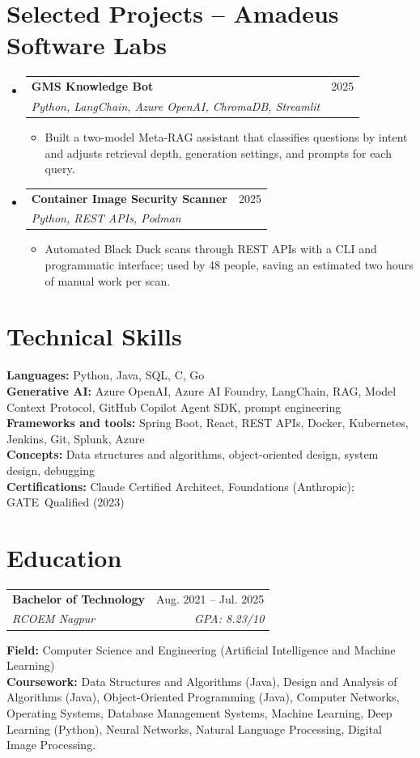 \documentclass[a4paper,11pt]{article}
\makeatletter
\newcommand{\entry}[4]{\item\begin{tabularx}{\textwidth}{@{}Xr@{}}\textbf{#1}& #2\\\textit{\small #3}&\textit{\small #4}\end{tabularx}\vspace{-5pt}}
\newcommand{\bulletpoint}[1]{\item\small{#1}}
\makeatother
\begin{document}
\section{Selected Projects -- Amadeus Software Labs}
\begin{itemize}[leftmargin=0in,label={}]
  \entry{GMS Knowledge Bot}{2025}{Python, LangChain, Azure OpenAI, ChromaDB, Streamlit}{}
  \begin{itemize}
    \bulletpoint{Built a two-model Meta-RAG assistant that classif{}ies questions by intent and adjusts retrieval depth, generation settings, and prompts for each query.}
  \end{itemize}
  \entry{Container Image Security Scanner}{2025}{Python, REST APIs, Podman}{}
  \begin{itemize}
    \bulletpoint{Automated Black Duck scans through REST APIs with a CLI and programmatic interface; used by 48 people, saving an estimated two hours of manual work per scan.}
  \end{itemize}
\end{itemize}

\section{Technical Skills}
\small\textbf{Languages:} Python, Java, SQL, C, Go \\
\textbf{Generative AI:} Azure OpenAI, Azure AI Foundry, LangChain, RAG, Model Context Protocol, GitHub Copilot Agent SDK, prompt engineering \\
\textbf{Frameworks and tools:} Spring Boot, React, REST APIs, Docker, Kubernetes, Jenkins, Git, Splunk, Azure \\
\textbf{Concepts:} Data structures and algorithms, object-oriented design, system design, debugging \\
\textbf{Certif{}ications:} Claude \mbox{Certif{}ied} Architect, Foundations (Anthropic); \mbox{GATE Qualif{}ied} (2023)

\section{Education}
\begin{tabularx}{\textwidth}{@{}Xr@{}}
  \textbf{Bachelor of Technology} & Aug. 2021 -- Jul. 2025 \\
  \textit{\small RCOEM Nagpur} & \textit{\small GPA: 8.23/10} \\
\end{tabularx}
\small\textbf{Field:} Computer Science and Engineering (Artif{}icial Intelligence and Machine Learning)\\
\small\textbf{Coursework:} Data Structures and Algorithms (Java), Design and Analysis of Algorithms (Java), Object-Oriented Programming (Java), Computer Networks, Operating Systems, Database Management Systems, Machine Learning, Deep Learning (Python), Neural Networks, Natural Language Processing, Digital Image Processing.
\end{document}
